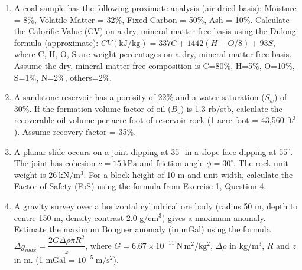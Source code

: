 \documentclass[11pt]{article}
\newcommand{\cle}[1]{{\popxbold\color{popdark}#1}}
\newcounter{popsec}
\newcounter{popsub}
\newcommand{\courssub}[1]{%
  \stepcounter{popsub}%
  \par\vspace{9pt}\noindent{\popxbold\fontsize{11.5}{13}\selectfont\color{popink}{\color{poporange}\thepopsec.\thepopsub}\hspace{6pt}#1}\par\nopagebreak\vspace{4pt}
}
\begin{document}
\begin{exercice}
\begin{enumerate}
\item A coal sample has the following proximate analysis (air-dried basis): Moisture = 8\%, Volatile Matter = 32\%, Fixed Carbon = 50\%, Ash = 10\%. Calculate the \cle{Calorific Value} (CV) on a dry, mineral-matter-free basis using the \cle{Dulong formula} (approximate): $CV (\mathrm{kJ/kg}) = 337C + 1442(H - O/8) + 93S$, where C, H, O, S are weight percentages on a dry, mineral-matter-free basis. Assume the dry, mineral-matter-free composition is C=80\%, H=5\%, O=10\%, S=1\%, N=2\%, others=2\%.
\item A sandstone reservoir has a porosity of 22\% and a water saturation ($S_w$) of 30\%. If the formation volume factor of oil ($B_o$) is 1.3 rb/stb, calculate the recoverable oil volume per acre-foot of reservoir rock (1 acre-foot = 43,560 ft$^3$). Assume recovery factor = 35\%.
\item A planar slide occurs on a joint dipping at $35^\circ$ in a slope face dipping at $55^\circ$. The joint has cohesion $c = 15\ \mathrm{kPa}$ and friction angle $\phi = 30^\circ$. The rock unit weight is $26\ \mathrm{kN/m^3}$. For a block height of 10 m and unit width, calculate the Factor of Safety (FoS) using the formula from Exercise 1, Question 4.
\item A gravity survey over a horizontal cylindrical ore body (radius 50 m, depth to centre 150 m, density contrast 2.0 g/cm$^3$) gives a maximum anomaly. Estimate the maximum Bouguer anomaly (in mGal) using the formula $\Delta g_{max} = \dfrac{2G \Delta \rho \pi R^2}{z}$, where $G = 6.67 \times 10^{-11}\ \mathrm{N\,m^2/kg^2}$, $\Delta \rho$ in kg/m$^3$, $R$ and $z$ in m. (1 mGal = $10^{-5}\ \mathrm{m/s^2}$).
\end{enumerate}
\end{exercice}

\courssub{I practise}
\end{document}
